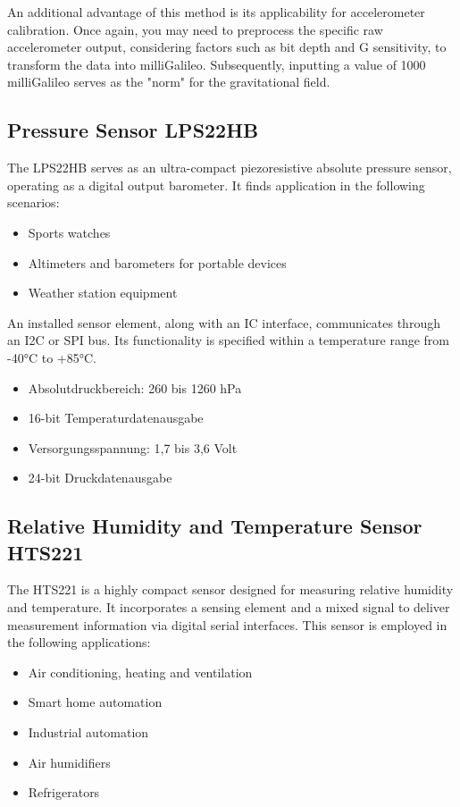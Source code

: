 An additional advantage of this method is its applicability for accelerometer calibration. Once again, you may need to preprocess the specific raw accelerometer output, considering factors such as bit depth and G sensitivity, to transform the data into milliGalileo. Subsequently, inputting a value of 1000 milliGalileo serves as the "norm" for the gravitational field.\cite{Mallon:2015}

\subsection{Pressure Sensor LPS22HB}

The LPS22HB serves as an ultra-compact piezoresistive absolute pressure sensor, operating as a digital output barometer. It finds application in the following scenarios:

\begin{itemize}
	\item Sports watches
	\item Altimeters and barometers for portable devices
	\item Weather station equipment
\end{itemize}

An installed sensor element, along with an IC interface, communicates through an I2C or SPI bus. Its functionality is specified within a temperature range from -40°C to +85°C.

\begin{itemize}
	\item Absolutdruckbereich: 260 bis 1260 hPa
	\item 16-bit Temperaturdatenausgabe
	\item Versorgungsspannung: 1,7 bis 3,6 Volt
	\item 24-bit Druckdatenausgabe
\end{itemize}

\subsection{Relative Humidity and Temperature Sensor HTS221}

The HTS221 is a highly compact sensor designed for measuring relative humidity and temperature. It incorporates a sensing element and a mixed signal to deliver measurement information via digital serial interfaces. This sensor is employed in the following applications:

\begin{itemize}
	\item Air conditioning, heating and ventilation
	\item Smart home automation
	\item Industrial automation
	\item Air humidifiers
	\item Refrigerators
\end{itemize}

